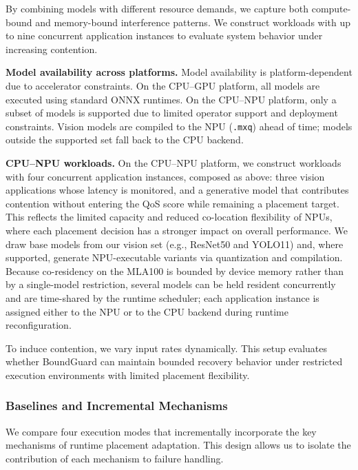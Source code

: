 \documentclass[conference]{IEEEtran}
\begin{document}
By combining models with different resource demands, we capture both compute-bound and memory-bound interference patterns. 
We construct workloads with up to nine concurrent application instances to evaluate system behavior under increasing contention.



\noindent\textbf{Model availability across platforms.}
Model availability is platform-dependent due to accelerator constraints. On the CPU--GPU platform, all models are executed using standard ONNX runtimes. 
On the CPU--NPU platform, only a subset of models is supported due to limited operator support and deployment constraints. \textcolor{navyblue}{Vision models are compiled to the NPU (\texttt{.mxq}) ahead of time; models outside the supported set fall back to the CPU backend.}


\noindent\textbf{CPU--NPU workloads.}
On the CPU--NPU platform, we construct workloads with four concurrent application instances, \textcolor{navyblue}{composed as above: three vision applications whose latency is monitored, and a generative model that contributes contention without entering the QoS score while remaining a placement target.}
This reflects the limited capacity and reduced co-location flexibility of NPUs, where each placement decision has a stronger impact on overall performance.
%
\textcolor{navyblue}{We draw base models from our vision set (e.g., ResNet50 and YOLO11) and, where supported, generate NPU-executable variants via quantization and compilation.
Because co-residency on the MLA100 is bounded by device memory rather than by a single-model restriction, several models can be held resident concurrently and are time-shared by the runtime scheduler; each application instance is assigned either to the NPU or to the CPU backend during runtime reconfiguration.}

To induce contention, we vary input rates dynamically. 
This setup evaluates whether BoundGuard can maintain bounded recovery behavior under restricted execution environments with limited placement flexibility.



\subsubsection{Baselines and Incremental Mechanisms}

We compare four execution modes that incrementally incorporate the key mechanisms of runtime placement adaptation.
This design allows us to isolate the contribution of each mechanism to failure handling.
\end{document}
